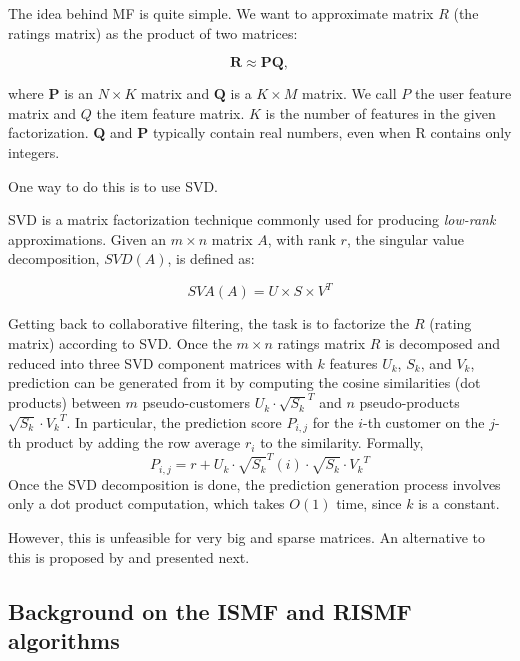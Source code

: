 \documentclass[10pt,a4paper]{article}  %
\begin{document}
The idea behind MF is quite simple. We want to approximate matrix $R$ (the ratings matrix) as the product of two matrices:

\begin{equation}
  \mathbf{R} \approx \mathbf{P}\mathbf{Q},
\end{equation}

where $\mathbf{P}$ is an $N \times K$ matrix and $\mathbf{Q}$ is a $K \times M$ matrix. We call $P$ the user feature matrix and $Q$ the item feature matrix. $K$ is the number of features in the given factorization. $\mathbf{Q}$ and $\mathbf{P}$ typically contain real numbers, even when R contains only integers.

One way to do this is to use SVD. 

SVD is a matrix factorization technique commonly used for producing \emph{low-rank} approximations. Given an $m \times n$ matrix $A$, with rank $r$, the singular value decomposition, $SVD(A)$, is defined as:

\begin{equation}
  SVA(A) = U \times S \times V^T
\end{equation}

Getting back to collaborative filtering, the task is to factorize the $R$ (rating matrix) according to SVD. Once the $m \times n$ ratings matrix $R$ is decomposed and reduced into three SVD component matrices with $k$ features $U_k$, $S_k$, and $V_k$, prediction can be generated from it by computing the cosine similarities (dot products) between $m$ pseudo-customers $U_k \cdot {\sqrt{S_k}^T}$ and $n$ pseudo-products ${\sqrt{S_k} \cdot {V_k}^T}$. In particular, the prediction score $P_{i,j}$ for the $i$-th customer on the $j$-th product by adding the row average $r_i$ to the similarity. Formally, 
\begin{equation}
  P_{i,j} = r + U_k \cdot {\sqrt{S_k}^T}(i) \cdot {\sqrt{S_k} \cdot {V_k}^T}
\end{equation}
Once the SVD decomposition is done, the prediction generation process involves only a dot product computation, which takes $O(1)$ time, since $k$ is a constant.

However, this is unfeasible for very big and sparse matrices. An alternative to this is proposed by \cite{takacs09scalable} and presented next. 

\subsection{Background on the ISMF and RISMF algorithms}
\label{ismf}
\end{document}
